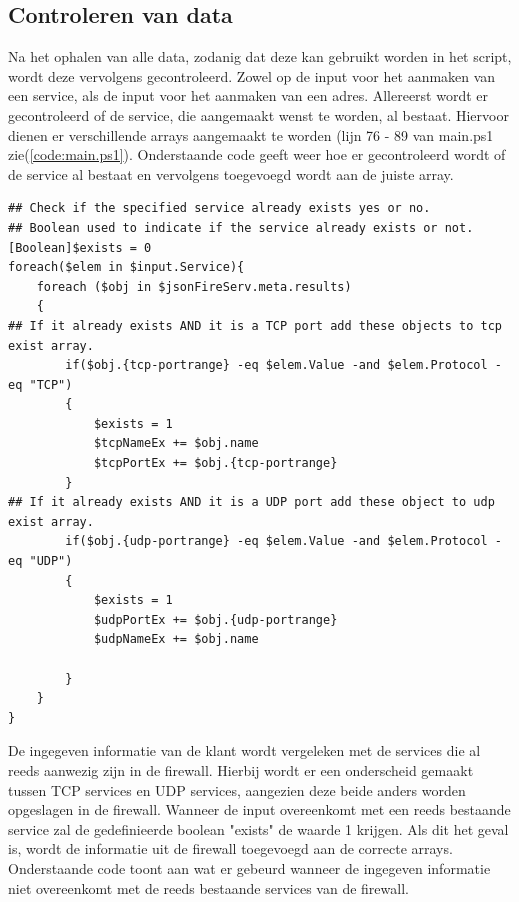 \subsection{Controleren van data}
Na het ophalen van alle data, zodanig dat deze kan gebruikt worden in het script, wordt deze vervolgens gecontroleerd. Zowel op de input voor het aanmaken van een service, als de input voor het aanmaken van een adres. Allereerst wordt er gecontroleerd of de service, die aangemaakt wenst te worden, al bestaat. Hiervoor dienen er verschillende arrays aangemaakt te worden (lijn 76 - 89 van main.ps1 zie(\ref{code:main.ps1}).
Onderstaande code geeft weer hoe er gecontroleerd wordt of de service al bestaat en vervolgens toegevoegd wordt aan de juiste array. 
\begin{lstlisting}[caption={main.ps1, controle of service bestaat deel 2}]
    ## Check if the specified service already exists yes or no. 
## Boolean used to indicate if the service already exists or not.
[Boolean]$exists = 0
foreach($elem in $input.Service){
    foreach ($obj in $jsonFireServ.meta.results)
    {
## If it already exists AND it is a TCP port add these objects to tcp exist array. 
        if($obj.{tcp-portrange} -eq $elem.Value -and $elem.Protocol -eq "TCP")
        {
            $exists = 1
            $tcpNameEx += $obj.name
            $tcpPortEx += $obj.{tcp-portrange}
        }
## If it already exists AND it is a UDP port add these object to udp exist array.
        if($obj.{udp-portrange} -eq $elem.Value -and $elem.Protocol -eq "UDP")
        {
            $exists = 1 
            $udpPortEx += $obj.{udp-portrange}
            $udpNameEx += $obj.name
            
        }
    }
}

\end{lstlisting}
De ingegeven informatie van de klant wordt vergeleken met de services die al reeds aanwezig zijn in de firewall. Hierbij wordt er een onderscheid gemaakt tussen TCP services en UDP services, aangezien deze beide anders worden opgeslagen in de firewall. Wanneer de input overeenkomt met een reeds bestaande service zal de gedefinieerde boolean "exists" de waarde 1 krijgen. Als dit het geval is, wordt de informatie uit de firewall toegevoegd aan de correcte arrays. Onderstaande code toont aan wat er gebeurd wanneer de ingegeven informatie niet overeenkomt met de reeds bestaande services van de firewall. 

